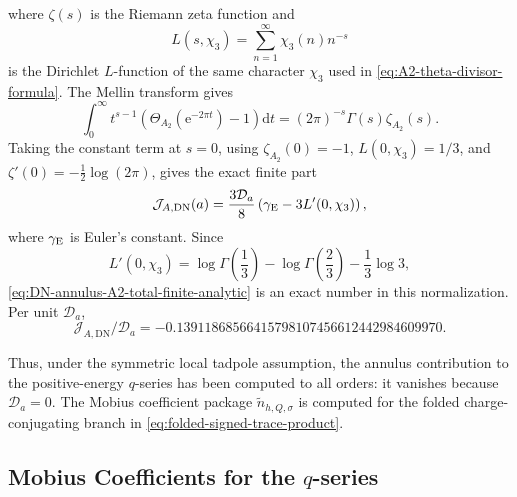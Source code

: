 \documentclass[11pt]{article}
\newcommand{\wt}{\widetilde}
\newcommand{\DN}{\mathrm{DN}}
\newcommand{\dd}{\mathrm{d}}
\newcommand{\e}{\mathrm{e}}
\begin{document}
where \(\zeta(s)\) is the Riemann zeta function and
\[
  L(s,\chi_3)=\sum_{n=1}^{\infty}\chi_3(n)n^{-s}
\]
is the Dirichlet \(L\)-function of the same character \(\chi_3\) used in
\eqref{eq:A2-theta-divisor-formula}. The Mellin transform gives
\[
  \int_0^\infty t^{s-1}\left(\Theta_{A_2}(\e^{-2\pi t})-1\right)\dd t
  =
  (2\pi)^{-s}\Gamma(s)\zeta_{A_2}(s).
\]
Taking the constant term at \(s=0\), using
\(\zeta_{A_2}(0)=-1\), \(L(0,\chi_3)=1/3\), and
\(\zeta'(0)=-\frac12\log(2\pi)\), gives the exact finite part
\begin{equation}
  \mathcal J_{A,\DN}(a)
  =
  \frac{3\mathcal D_a}{8}
  \left(\gamma_{\rm E}-3L'(0,\chi_3)\right),
  \label{eq:DN-annulus-A2-total-finite-analytic}
\end{equation}
where \(\gamma_{\rm E}\) is Euler's constant. Since
\[
  L'(0,\chi_3)
  =
  \log\Gamma\!\left(\frac13\right)
  -
  \log\Gamma\!\left(\frac23\right)
  -
  \frac13\log 3,
\]
\eqref{eq:DN-annulus-A2-total-finite-analytic} is an exact number in this normalization. Per
unit \(\mathcal D_a\),
\begin{equation}
  \mathcal J_{A,\DN}/\mathcal D_a
  =
  -0.13911868566415798107456612442984609970 .
  \label{eq:DN-annulus-A2-total-finite-number}
\end{equation}

Thus, under the symmetric local tadpole assumption, the annulus contribution to the
positive-energy \(q\)-series has been computed to all orders: it vanishes because
\(\mathcal D_a=0\). The Mobius coefficient package
\(\wt n_{h,Q,\sigma}\) is computed for the folded charge-conjugating branch in
\eqref{eq:folded-signed-trace-product}.

\subsection{Mobius Coefficients for the \texorpdfstring{$q$}{q}-series}
\end{document}
